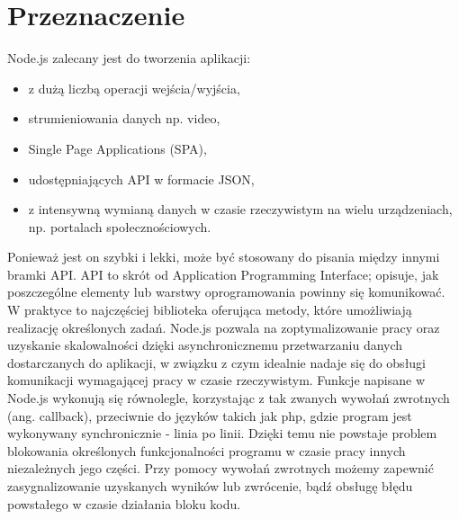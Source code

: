 \documentclass[12pt]{report}
\begin{document}
\section{Przeznaczenie}
Node.js zalecany jest do tworzenia aplikacji: 
\begin{itemize}
\item z dużą liczbą operacji wejścia/wyjścia,
\item strumieniowania danych np. video, 
\item Single Page Applications (SPA),
\item udostępniających API w formacie JSON,
\item z intensywną wymianą danych w czasie rzeczywistym na wielu urządzeniach, np. portalach społecznościowych.
\end{itemize} 
Ponieważ jest on szybki i lekki, może być stosowany do pisania między innymi bramki API. 
API to skrót od Application Programming Interface; opisuje, jak poszczególne elementy lub warstwy oprogramowania powinny się komunikować. 
W praktyce to najczęściej biblioteka oferująca metody, które umożliwiają realizację określonych zadań. 
Node.js pozwala na zoptymalizowanie pracy oraz uzyskanie skalowalności dzięki asynchronicznemu przetwarzaniu danych dostarczanych do aplikacji, w związku z czym idealnie nadaje się do obsługi komunikacji wymagającej pracy w czasie rzeczywistym. 
Funkcje napisane w Node.js wykonują się równolegle, korzystając z tak zwanych wywołań zwrotnych (ang. callback), przeciwnie do języków takich jak php, gdzie program jest wykonywany synchronicznie - linia po linii. 
Dzięki temu nie powstaje problem blokowania określonych funkcjonalności programu w czasie pracy innych niezależnych jego części. 
Przy pomocy wywołań zwrotnych możemy zapewnić zasygnalizowanie uzyskanych wyników lub zwrócenie, bądź obsługę błędu powstałego w czasie działania bloku kodu.
\end{document}
